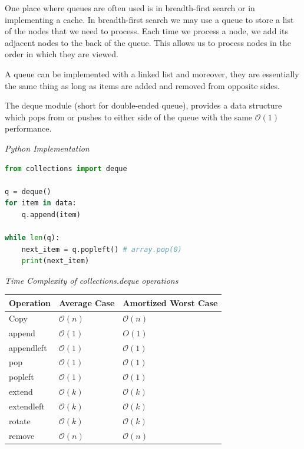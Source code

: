 \documentclass{article}
\newcommand{\bigO}{\mathcal{O}}
\begin{document}
    One place where queues are often used is in breadth-first search or in implementing a cache. In breadth-first search we may use a queue to store a list of the nodes that we need to process. Each time we process a node, we add its adjacent nodes to the back of the queue. This allows us to process nodes in the order in which they are viewed. 
    
    A queue can be implemented with a linked list and moreover, they are essentially the same thing as long as items are added and removed from opposite sides.
    
    The deque module (short for double-ended queue), provides a data structure which pops from or pushes to either side of the queue with the same $\bigO(1)$ performance. 
    
\vspace{8pt} \emph{Python Implementation}
\begin{lstlisting}[language=Python]
from collections import deque 

q = deque() 
for item in data:
    q.append(item) 
 
while len(q):
    next_item = q.popleft() # array.pop(0)
    print(next_item)

\end{lstlisting}

    \vspace{8pt} \emph{Time Complexity of collections.deque operations}
    \begin{table}[H]
        \begin{tabular}{|l|l|l|}
            \hline
            \textbf{Operation} & \textbf{Average Case} & \textbf{Amortized Worst Case} \\
            \hline
            Copy & $\bigO(n)$ & $\bigO(n)$ \\
            append & $\bigO(1)$ & $O(1)$ \\
            appendleft & $\bigO(1)$ & $\bigO(1)$ \\
            pop & $\bigO(1)$ & $\bigO(1)$ \\
            popleft & $\bigO(1)$ & $\bigO(1)$ \\
            extend & $\bigO(k)$ & $\bigO(k)$ \\
            extendleft & $\bigO(k)$ & $\bigO(k)$ \\
            rotate & $\bigO(k)$ & $\bigO(k)$\\
            remove & $\bigO(n)$ & $\bigO(n)$\\
            \hline
        \end{tabular}
    \end{table}
\end{document}
